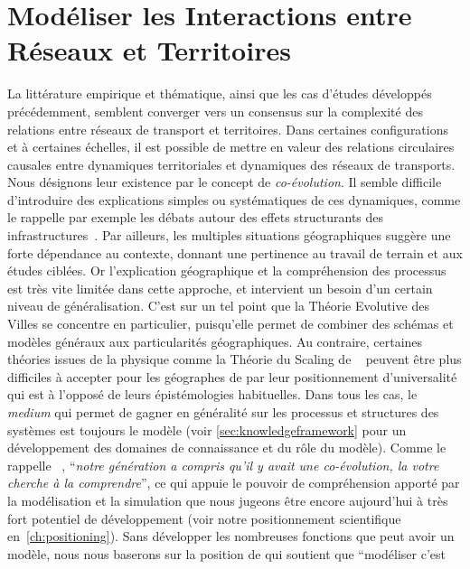 

\chapter{Modéliser les Interactions entre Réseaux et Territoires}


\label{ch:modelinginteractions}





La littérature empirique et thématique, ainsi que les cas d'études développés précédemment, semblent converger vers un consensus sur la complexité des relations entre réseaux de transport et territoires. Dans certaines configurations et à certaines échelles, il est possible de mettre en valeur des relations circulaires causales entre dynamiques territoriales et dynamiques des réseaux de transports. Nous désignons leur existence par le concept de \emph{co-évolution}. Il semble difficile d'introduire des explications simples ou systématiques de ces dynamiques, comme le rappelle par exemple les débats autour des effets structurants des infrastructures~\cite{offner1993effets}. Par ailleurs, les multiples situations géographiques suggère une forte dépendance au contexte, donnant une pertinence au travail de terrain et aux études ciblées. Or l'explication géographique et la compréhension des processus est très vite limitée dans cette approche, et intervient un besoin d'un certain niveau de généralisation. C'est sur un tel point que la Théorie Evolutive des Villes se concentre en particulier, puisqu'elle permet de combiner des schémas et modèles généraux aux particularités géographiques. Au contraire, certaines théories issues de la physique comme la Théorie du Scaling de ~\cite{west2017scaling} peuvent être plus difficiles à accepter pour les géographes de par leur positionnement d'universalité qui est à l'opposé de leurs épistémologies habituelles. Dans tous les cas, le \emph{medium} qui permet de gagner en généralité sur les processus et structures des systèmes est toujours le modèle (voir \ref{sec:knowledgeframework} pour un développement des domaines de connaissance et du rôle du modèle). Comme le rappelle ~\cite{raimbault2017entretiens}, ``\textit{notre génération a compris qu'il y avait une co-évolution, la votre cherche à la comprendre}'', ce qui appuie le pouvoir de compréhension apporté par la modélisation et la simulation que nous jugeons être encore aujourd'hui à très fort potentiel de développement (voir notre positionnement scientifique en~\ref{ch:positioning}). Sans développer les nombreuses fonctions que peut avoir un modèle, nous nous baserons sur la position de  qui soutient que ``modéliser c'est 
